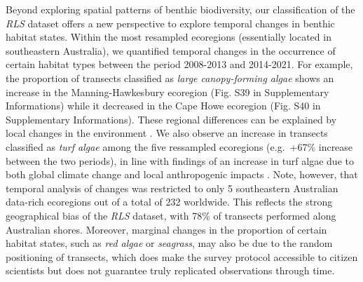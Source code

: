 \begin{refsection}
Beyond exploring spatial patterns of benthic biodiversity, our
classification of the \emph{RLS} dataset offers a new perspective to
explore temporal changes in benthic habitat states. Within the most
resampled ecoregions (essentially located in southeastern Australia), we
quantified temporal changes in the occurrence of certain habitat types
between the period 2008-2013 and 2014-2021. For example, the proportion
of transects classified as \emph{large canopy-forming algae} shows an
increase in the Manning-Hawkesbury ecoregion (Fig. S39 in Supplementary
Informations) while it decreased in the Cape Howe ecoregion (Fig. S40 in
Supplementary Informations). These regional differences can be explained
by local changes in the environment \autocite{Krumhansl_2016}. We also
observe an increase in transects classified as \emph{turf algae} among
the five ressampled ecoregions (e.g.~+67\% increase between the two
periods), in line with findings of an increase in turf algae due to both
global climate change and local anthropogenic impacts
\autocite{Filbee-Dexter_2018}. Note, however, that temporal analysis of
changes was restricted to only 5 southeastern Australian data-rich
ecoregions out of a total of 232 worldwide. This reflects the strong
geographical bias of the \emph{RLS} dataset, with 78\% of transects
performed along Australian shores. Moreover, marginal changes in the
proportion of certain habitat states, such as \emph{red algae} or
\emph{seagrass}, may also be due to the random positioning of transects,
which does make the survey protocol accessible to citizen scientists but
does not guarantee truly replicated observations through time.


\end{refsection}

